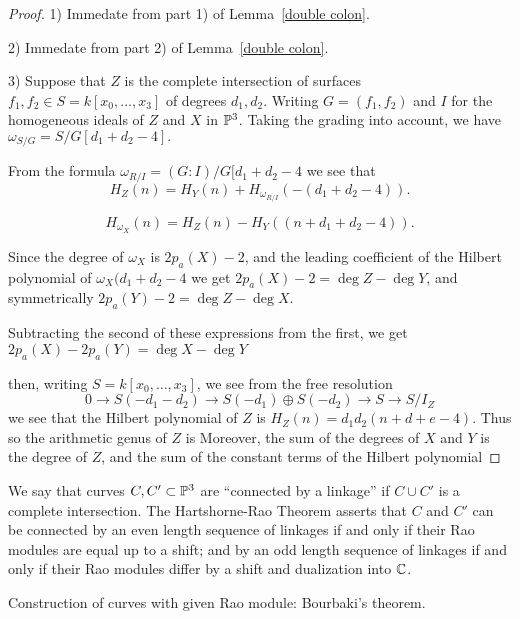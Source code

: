 \begin{proof}
 1) Immedate from part 1) of Lemma~\ref{double colon}.
 
 2) Immedate from part 2) of Lemma~\ref{double colon}.
 
3) Suppose that $Z$ is the complete intersection of surfaces $f_{1}, f_{2} \in S = k[x_{0},\dots,x_{3}]$ of degrees $d_{1}, d_{2}$. Writing
$G = (f_{1}, f_{2})$ and $I$ for the homogeneous ideals of $Z$ and $X$ in ${\mathbb P}^{3}$. Taking the grading into
account, we have $\omega_{S/G} = S/G[d_{1}+d_{2}-4].$

From the formula  $\omega_{R/I} = (G:I)/G[d_{1}+d_{2}-4$ we see that 
$$
H_{Z}(n) = H_{Y}(n) + H_{\omega_{R/I}}(-(d_{1}+d_{2}-4)).
$$

$$
H_{\omega_{X}}(n) = H_{Z}(n) - H_{Y}((n+d_{1}+d_{2}-4) ).
$$

Since the degree of $\omega_{X}$ is $2p_{a}(X) -2$, and the leading coefficient of the 
Hilbert polynomial of $\omega_{X}(d_{1}+d_{2}-4$ we get 
$2p_{a}(X) -2 = \deg Z - \deg Y$, and symmetrically 
$2p_{a}(Y) -2 = \deg Z - \deg X$.

Subtracting the second of these expressions from the first, we get
$2p_{a}(X)-2p_{a}(Y) = \deg X -\deg Y$

 then, writing $S = k[x_{0},\dots, x_{3}]$, we see from the free resolution
$$
0\to S(-d_{1}-d_{2}) \to S(-d_{1})\oplus S(-d_{2}) \to S \to S/I_{Z}
$$
we see that the Hilbert polynomial of $Z$ is $H_{Z}(n)= d_{1}d_{2}(n + d+e-4)$. Thus so the arithmetic genus of $Z$ is Moreover, the sum of the degrees of $X$ and $Y$ is the degree of $Z$, and
the sum of the constant terms of the Hilbert polynomial
\end{proof}

\begin{fact} We say that curves $C,C'\subset {\mathbb P}^{3}$ are ``connected by a linkage'' if $C\cup C'$
is a complete intersection.
 The Hartshorne-Rao Theorem \cite{} asserts that 
$C$ and $C'$ can be connected by an even length sequence of linkages if and only if their Rao modules are equal up to a shift; and by an odd length sequence of linkages if and only if their Rao modules differ by a shift and dualization into ${\mathbb C}$.
\end{fact}



Construction of curves with given Rao module: Bourbaki's theorem.

